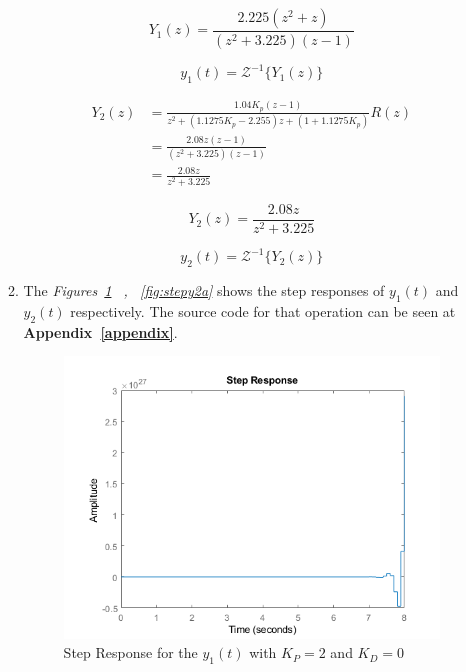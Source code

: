 \documentclass[a4paper,12pt]{article}
\begin{document}
\begin{enumerate}
\begin{enumerate}
 		$$\boxed{Y_1(z) =   \frac{2.225(z^2+z)}{(z^2+3.225)(z-1)}  }  $$	
 		
		$$\boxed{  y_1(t) = \mathcal{Z}^{-1} \{Y_1(z)	\} } $$
 		
 		\begin{equation*}
 		\begin{split}
 		Y_2(z) &=   \frac{1.04 K_p(z-1 )}{z^2+(1.1275K_p-2.255)z+(1+1.1275K_p) }R(z) \\	
 		&=  \frac{2.08z(z-1)}{(z^2+3.225)(z-1)} \\ 
 		&= \frac{2.08z}{z^2+3.225}
 		\end{split}
 		\end{equation*}
 		
 		$$\boxed{Y_2(z) =   \frac{2.08z}{z^2+3.225} }  $$
 		
 		
 				
 		$$\boxed{ y_2(t) = \mathcal{Z}^{-1} \{Y_2(z)	\} }$$
 		
 		
 		\item The \textit{Figures\ \ref{fig:stepy1a} \ , \ \ref{fig:stepy2a}} shows the step responses of $y_1(t)$ and $y_2(t)$ respectively.  The source code for that operation can be seen at \textbf{Appendix~\ref{appendix}}.
 		
 		
 			
 			\begin{figure}[H]
 				\center
 				\setlength{\unitlength}{\textwidth} 
 				\includegraphics[width=1.0\unitlength]{images/stepy1a}
 				\caption{\label{fig:stepy1a} Step Response for the $y_1(t)$ with $K_P=2$ and $K_D=0$}
 			\end{figure}
 		

\end{enumerate}
\end{enumerate}
\end{document}
